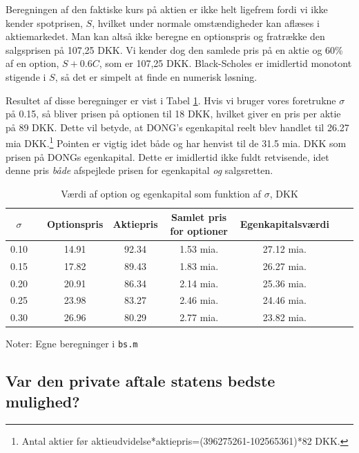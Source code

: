 \documentclass{article}
\begin{document}
Beregningen af den faktiske kurs på aktien er ikke helt ligefrem fordi vi ikke kender spotprisen, $S$, hvilket under normale omstændigheder kan aflæses i aktiemarkedet. Man kan altså ikke  beregne en optionspris og fratrække den salgsprisen på 107,25 DKK. Vi kender dog den samlede pris på en aktie og 60\% af en option, $S + 0.6 C$, som er 107,25 DKK. Black-Scholes er imidlertid monotont stigende i $S$, så det er simpelt at finde en numerisk løsning.

Resultet af disse beregninger er vist i Tabel \ref{tab:vary_sigma}.  Hvis vi bruger vores foretrukne $\sigma$ på 0.15, så bliver prisen på optionen til 18 DKK, hvilket giver en pris per aktie på 89 DKK. Dette vil betyde, at DONG's egenkapital reelt blev handlet til 26.27 mia DKK.\footnote{Antal aktier før aktieudvidelse*aktiepris=(396275261-102565361)*82 DKK.}  Pointen er vigtig idet både \cite{FM2013a} og \cite{DONG2015} har henvist til de 31.5  mia. DKK som prisen på DONGs egenkapital. Dette er imidlertid ikke fuldt  retvisende, idet denne pris \emph{både} afspejlede prisen for egenkapital \emph{og} salgsretten. 


\begin{table}[h]
	\caption{V\ae{}rdi af option og egenkapital som funktion af $\sigma$, DKK}
	\label{tab:vary_sigma}
	\begin{tabularx}{\linewidth}{cXcccccr}
	\toprule[1pt] 
	$\sigma$  && Optionspris & Aktiepris & Samlet pris for optioner &Egenkapitalsv\ae{}rdi \\ \hline 
	0.10 && 14.91 & 92.34 & 1.53 mia. & 27.12 mia. \\
	0.15 && 17.82 & 89.43 & 1.83 mia. & 26.27 mia. \\
	0.20 && 20.91 & 86.34 & 2.14 mia. & 25.36 mia. \\
	0.25 && 23.98 & 83.27 & 2.46 mia. & 24.46 mia. \\
	0.30 && 26.96 & 80.29 & 2.77 mia. & 23.82 mia. \\
	\bottomrule[1pt]
	\end{tabularx}
	\begin{minipage}{\linewidth}
		\footnotesize{Noter: Egne beregninger i \texttt{bs.m} }
	\end{minipage}
\end{table}

\subsection{Var den private aftale statens bedste mulighed?}
\end{document}
